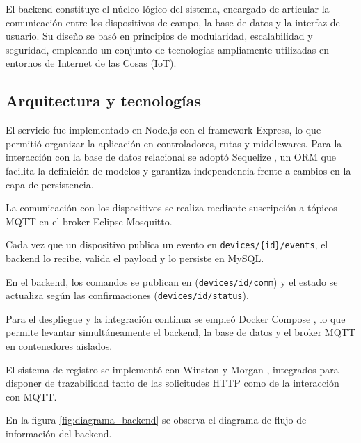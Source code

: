 El backend constituye el núcleo lógico del sistema, encargado de articular la comunicación entre los dispositivos de campo, la base de datos y la interfaz de usuario. Su diseño se basó en principios de modularidad, escalabilidad y seguridad, empleando un conjunto de tecnologías ampliamente utilizadas en entornos de Internet de las Cosas (IoT).


\subsection{Arquitectura y tecnologías}

El servicio fue implementado en Node.js con el framework Express, lo que permitió organizar la aplicación en controladores, rutas y middlewares. Para la interacción con la base de datos relacional se adoptó Sequelize \cite{sequelize}, un ORM \cite{fowler2002patterns} que facilita la definición de modelos y garantiza independencia frente a cambios en la capa de persistencia.

La comunicación con los dispositivos se realiza mediante suscripción a tópicos MQTT en el broker Eclipse Mosquitto. 

Cada vez que un dispositivo publica un evento en \texttt{devices/\{id\}/events}, 
el backend lo recibe, valida el payload y lo persiste en MySQL.
 
En el backend, los comandos se publican en (\texttt{devices/{id}/comm}) y el estado se actualiza según las confirmaciones (\texttt{devices/{id}/status}). 

Para el despliegue y la integración continua se empleó Docker Compose \cite{docker_compose}, lo que permite levantar simultáneamente el backend, la base de datos y el broker MQTT \cite{mqttSpec} en contenedores aislados.

El sistema de registro se implementó con Winston  \cite{winston} y Morgan \cite{morgan}, integrados para disponer de trazabilidad tanto de las solicitudes HTTP como de la interacción con MQTT.

En la figura \ref{fig:diagrama_backend} se observa el diagrama de flujo de información del backend.


